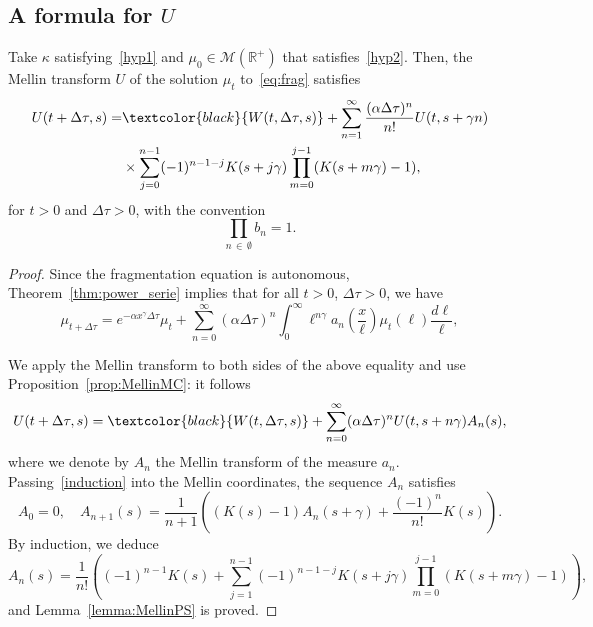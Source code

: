 \documentclass[AHL,Unicode,longabstracts,published]{cedram}
\newcommand*\dst{\displaystyle}
\renewcommand*\a{\alpha}
\newcommand*\R{\mathbb{R}}
\newcommand*\M{\mathcal{M}}
\newcommand{\Mag}[1]{\textcolor{black}{#1}}
\begin{document}
\subsection{A formula for \texorpdfstring{$U$}{U}}
\begin{lemm}\label{lemma:MellinPS}
Take $\kappa$ satisfying~\eqref{hyp1} and $\mu_0\in \M(\R^+)$
that satisfies~\eqref{hyp2}. Then, the Mellin transform $U$ of the solution $\mu_t$ to~\eqref{eq:frag} satisfies
\begin{equation}\label{U_power_serie_inter}
\begin{aligned}
U(t+\Delta \tau, s) =&
\Mag{W(t,\Delta \tau, s) } + \sum_{n=1}^{\infty} \dfrac{(\a \Delta \tau)^n}{n!}U(t,s+\gamma n)\\
&\times \sum_{j=0}^{n-1}(-1)^{n-1-j}K(s+j\gamma)
\prod_{m=0}^{j-1} (K(s+m\gamma)-1),
\end{aligned}
\end{equation}
for $t>0$ and $\Delta \tau >0$, with the convention
\begin{equation*}
\prod_{n\,\in\,\emptyset} b_n=1.
\end{equation*}
\end{lemm}

\begin{proof}
Since the fragmentation equation is autonomous, Theorem~\ref{thm:power_serie} implies that for all $t>0$, $\Delta \tau >0$, we have
\begin{equation*}
\mu_{t+\Delta \tau }= e^{-\a x^{\gamma}\Delta \tau } \mu_t + \sum_{n=0}^{\infty} (\a \Delta \tau)^n
\dst\int_0^{\infty} \ell^{n\gamma}a_n\left(\dfrac{x}{\ell}\right)\mu_t(\ell) \dfrac{d\ell}\ell{},
\end{equation*}


We apply the Mellin transform to both sides of the above equality and use Proposition~\ref{prop:MellinMC}: it follows
\begin{equation*}
U(t+\Delta \tau,s) = \Mag{W(t,\Delta \tau, s) } + \sum_{n=0}^{\infty}(\a\Delta \tau)^n U(t,s+n\gamma)A_n(s),
\end{equation*}
where we denote by $A_n$ the Mellin transform of the measure $a_n$. Passing~\eqref{induction} into the Mellin coordinates, the sequence $A_n$ satisfies
\begin{equation*}
A_0=0, \quad A_{n+1}(s) = \dfrac{1}{n+1} \left((K(s)-1) A_n(s+\gamma) +\dfrac{(-1)^n}{n!}K(s) \right).
\end{equation*}
By induction, we deduce
\begin{equation*}
A_n(s) = \dfrac{1}{n!}\left((-1)^{n-1}K(s) + \sum_{j=1}^{n-1}(-1)^{n-1-j}K(s+j\gamma)
\prod_{m=0}^{j-1} (K(s+m\gamma)-1) \right),
\end{equation*}
and Lemma~\ref{lemma:MellinPS} is proved.
\end{proof}
\end{document}
